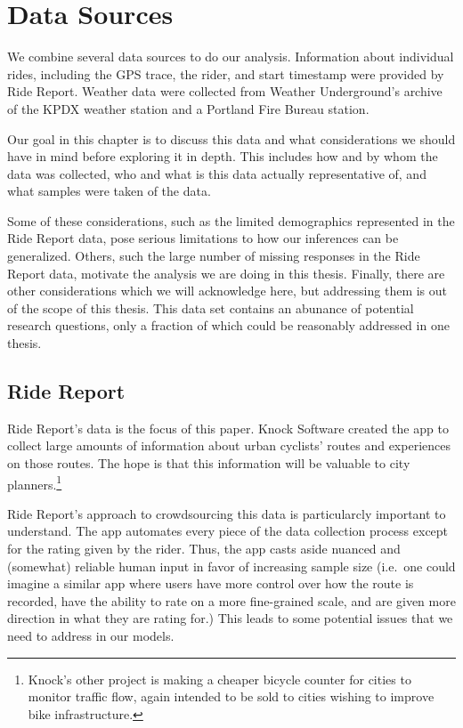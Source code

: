 \documentclass[12pt,twoside]{reedthesis}
\begin{document}
  \chapter{Data Sources}\label{data-sources}
  
  We combine several data sources to do our analysis. Information about
  individual rides, including the GPS trace, the rider, and start
  timestamp were provided by Ride Report. Weather data were collected from
  Weather Underground's archive of the KPDX weather station and a Portland
  Fire Bureau station.
  
  Our goal in this chapter is to discuss this data and what considerations
  we should have in mind before exploring it in depth. This includes how
  and by whom the data was collected, who and what is this data actually
  representative of, and what samples were taken of the data.
  
  Some of these considerations, such as the limited demographics
  represented in the Ride Report data, pose serious limitations to how our
  inferences can be generalized. Others, such the large number of missing
  responses in the Ride Report data, motivate the analysis we are doing in
  this thesis. Finally, there are other considerations which we will
  acknowledge here, but addressing them is out of the scope of this
  thesis. This data set contains an abunance of potential research
  questions, only a fraction of which could be reasonably addressed in one
  thesis.
  
  \section{Ride Report}\label{ride-report}
  
  Ride Report's data is the focus of this paper. Knock Software created
  the app to collect large amounts of information about urban cyclists'
  routes and experiences on those routes. The hope is that this
  information will be valuable to city planners.\footnote{Knock's other
    project is making a cheaper bicycle counter for cities to monitor
    traffic flow, again intended to be sold to cities wishing to improve
    bike infrastructure.}
  
  Ride Report's approach to crowdsourcing this data is particularcly
  important to understand. The app automates every piece of the data
  collection process except for the rating given by the rider. Thus, the
  app casts aside nuanced and (somewhat) reliable human input in favor of
  increasing sample size (i.e.~one could imagine a similar app where users
  have more control over how the route is recorded, have the ability to
  rate on a more fine-grained scale, and are given more direction in what
  they are rating for.) This leads to some potential issues that we need
  to address in our models.
  
\end{document}
